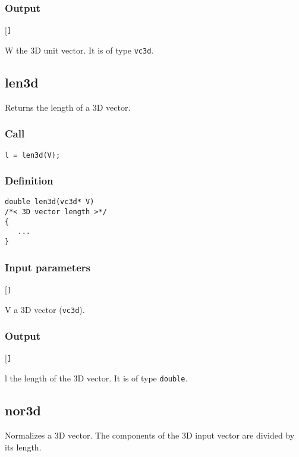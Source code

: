 \subsubsection*{Output}
\begin{desclist}{\tt }{\quad}[\tt ]
   \setlength\itemsep{0pt}
   \item[W] the 3D unit vector. It is of type \texttt{vc3d}.
\end{desclist}




\subsection{{len3d}}
Returns the length of a 3D vector.

\subsubsection*{Call}
\begin{verbatim}l = len3d(V);\end{verbatim}

\subsubsection*{Definition}
\begin{verbatim}
double len3d(vc3d* V)
/*< 3D vector length >*/
{
   ...
}
\end{verbatim}

\subsubsection*{Input parameters}
\begin{desclist}{\tt }{\quad}[\tt ]
   \setlength\itemsep{0pt}
   \item[V] a 3D vector (\texttt{vc3d}).     
\end{desclist}

\subsubsection*{Output}
\begin{desclist}{\tt }{\quad}[\tt ]
   \setlength\itemsep{0pt}
   \item[l] the length of the 3D vector. It is of type \texttt{double}.
\end{desclist}




\subsection{{nor3d}}
Normalizes a 3D vector. The components of the 3D input vector are divided by its length. 

